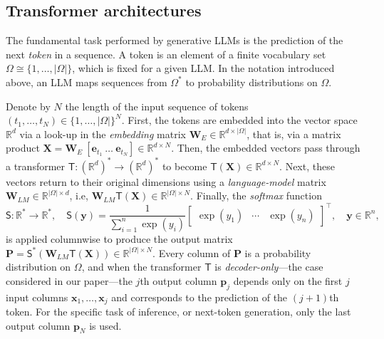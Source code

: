 \documentclass[namedate,webpdf,imanum]{ima-authoring-template}
\newcommand{\Real}{\mathbb{R}}
\newcommand{\Matrix}[1]{\mathbf{#1}}
\newcommand{\trans}{\intercal}
\newcommand{\Layer}[1]{\mathsf{#1}}
\numberwithin{equation}{section}
\begin{document}
\subsection{Transformer architectures}
\label{subsec:transformer_architecture}
The fundamental task performed by generative LLMs is the prediction of the next \emph{token} in a sequence.
A token is an element of a finite vocabulary set $\Omega \cong \{ 1, \ldots, |\Omega| \}$, which is fixed for a given LLM.
In the notation introduced above, an LLM maps sequences from $\Omega^\ast$ to probability distributions on $\Omega$.

Denote by $N$ the length of the input sequence of tokens $(t_1, \ldots, t_N) \in \{ 1, \ldots, |\Omega| \}^N$.
First, the tokens are embedded into the vector space $\Real^{d}$ via a look-up in the \emph{embedding} matrix $\Matrix{W}_{E} \in \Real^{d \times |\Omega|}$, that is, via a matrix product $\Matrix{X} = \Matrix{W}_{E}~[\Matrix{e}_{t_1}~\ldots~\Matrix{e}_{t_N}] \in \Real^{d \times N}$.
Then, the embedded vectors pass through a transformer $\Layer{T} : (\Real^d)^\ast \to (\Real^d)^\ast$ to become $\Layer{T}(\Matrix{X}) \in \Real^{d \times N}$. 
Next, these vectors return to their original dimensions using a \emph{language-model} matrix $\Matrix{W}_{LM} \in \Real^{|\Omega| \times d}$, i.e, $\Matrix{W}_{LM} \Layer{T}(\Matrix{X}) \in \Real^{|\Omega| \times N}$.
Finally, the \emph{softmax} function
\begin{equation}
\label{eq:softmax}
    \Layer{S} : \Real^\ast \to \Real^\ast, \quad 
    \Layer{S}(\Matrix{y}) = \frac{1}{\sum_{i = 1}^n \exp(y_i)} \begin{bmatrix}
        \exp(y_1) & \cdots & \exp(y_n)
    \end{bmatrix}^\trans, \quad \Matrix{y} \in \Real^n,
\end{equation}
is applied columnwise to produce the output matrix $\Matrix{P} = \Layer{S}^\ast(\Matrix{W}_{LM} \Layer{T}(\Matrix{X})) \in \Real^{|\Omega| \times N}$.
Every column of $\Matrix{P}$ is a probability distribution on $\Omega$, and when the transformer $\Layer{T}$ is \emph{decoder-only}---the case considered in our paper---the $j$th output column $\Matrix{p}_j$ depends only on the first $j$ input columns $\Matrix{x}_1, \ldots, \Matrix{x}_j$ and corresponds to the prediction of the $(j+1)$th token.
For the specific task of inference, or next-token generation, only the last output column $\Matrix{p}_N$ is used.
\end{document}
